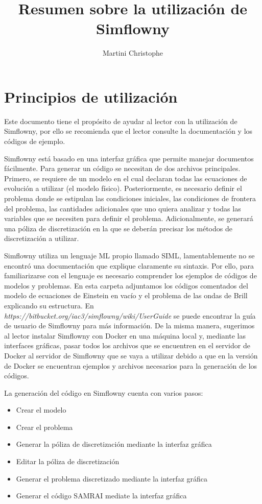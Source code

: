 \documentclass[11pt]{article}
\title{Resumen sobre la utilización de Simflowny}
\author{Martini Christophe}
\begin{document}
\maketitle
\tableofcontents
\section{Principios de utilización}
Este documento tiene el propósito de ayudar al lector con la utilización de Simflowny, por ello se recomienda que el lector consulte la documentación y los códigos de ejemplo.

Simflowny está basado en una interfaz gráfica que permite manejar documentos fácilmente. Para generar un código se necesitan de dos archivos principales. Primero, se requiere de un modelo en el cual declaran todas las ecuaciones de evolución a utilizar (el modelo físico). Posteriormente, es necesario definir el problema donde se estipulan las condiciones iniciales, las condiciones de frontera del problema, las cantidades adicionales que uno quiera analizar y todas las variables que se necesiten para definir el problema. Adicionalmente, se generará una póliza de discretización en la que se deberán precisar los métodos de discretización a utilizar.

Simflowny utiliza un lenguaje ML propio llamado SIML, lamentablemente no se encontró una documentación que explique claramente su sintaxis. Por ello, para familiarizarse con el lenguaje es necesario comprender los ejemplos de códigos de modelos y problemas. En esta carpeta adjuntamos los códigos comentados del modelo de ecuaciones de Einstein en vacío y el problema de las ondas de Brill explicando su estructura. En {\itshape https://bitbucket.org/iac3/simflowny/wiki/UserGuide} se puede encontrar la guía de usuario de Simflowny para más información. De la misma manera, sugerimos al lector instalar Simflowny con Docker en una máquina local y, mediante las interfaces gráficas, pasar todos los archivos que se encuentren en el servidor de Docker al servidor de Simflowny que se vaya a utilizar debido a que en la versión de Docker se encuentran ejemplos y archivos necesarios para la generación de los códigos.

La generación del código en Simflowny cuenta con varios pasos:
\begin{itemize}
\item Crear el modelo
\item Crear el problema
\item Generar la póliza de discretización mediante la interfaz gráfica
\item Editar la póliza de discretización
\item Generar el problema discretizado mediante la interfaz gráfica
\item Generar el código SAMRAI mediate la interfaz gráfica
\end{itemize}
\end{document}
